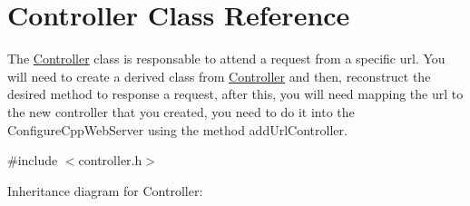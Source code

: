 \hypertarget{class_controller}{}\section{Controller Class Reference}
\label{class_controller}


The \hyperlink{class_controller}{Controller} class is responsable to attend a request from a specific url. You will need to create a derived class from \hyperlink{class_controller}{Controller} and then, reconstruct the desired method to response a request, after this, you will need mapping the url to the new controller that you created, you need to do it into the Configure\+Cpp\+Web\+Server using the method add\+Url\+Controller.  




{\ttfamily \#include $<$controller.\+h$>$}



Inheritance diagram for Controller\+:

